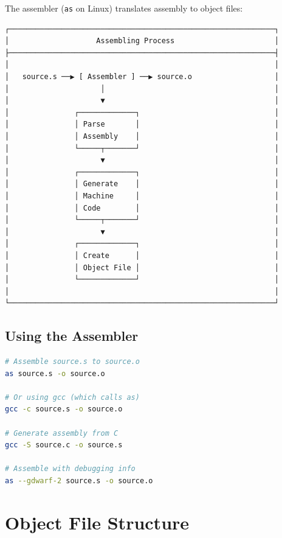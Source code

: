 The assembler (\texttt{as} on Linux) translates assembly to object files:

\begin{verbatim}
┌─────────────────────────────────────────────────────────────┐
│                    Assembling Process                       │
├─────────────────────────────────────────────────────────────┤
│                                                             │
│   source.s ──▶ [ Assembler ] ──▶ source.o                   │
│                     │                                       │
│                     ▼                                       │
│               ┌─────────────┐                               │
│               │ Parse       │                               │
│               │ Assembly    │                               │
│               └─────┬───────┘                               │
│                     ▼                                       │
│               ┌─────────────┐                               │
│               │ Generate    │                               │
│               │ Machine     │                               │
│               │ Code        │                               │
│               └─────┬───────┘                               │
│                     ▼                                       │
│               ┌─────────────┐                               │
│               │ Create      │                               │
│               │ Object File │                               │
│               └─────────────┘                               │
│                                                             │
└─────────────────────────────────────────────────────────────┘
\end{verbatim}

\subsection{Using the Assembler}

\begin{lstlisting}[language=bash]
# Assemble source.s to source.o
as source.s -o source.o

# Or using gcc (which calls as)
gcc -c source.s -o source.o

# Generate assembly from C
gcc -S source.c -o source.s

# Assemble with debugging info
as --gdwarf-2 source.s -o source.o
\end{lstlisting}

\section{Object File Structure}

